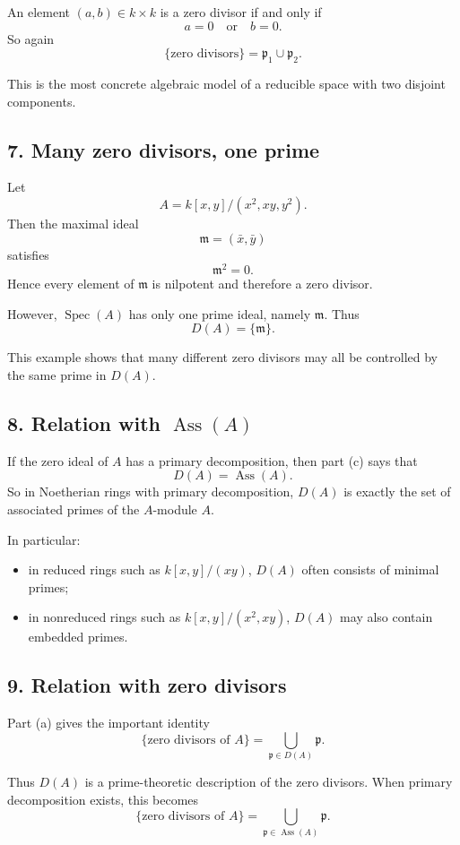 \documentclass[12pt,a4paper,oneside]{report}
\DeclareMathOperator{\Spec}{Spec}
\DeclareMathOperator{\Ass}{Ass}
\theoremstyle{notespace}
\begin{document}
	An element \((a,b)\in k\times k\) is a zero divisor if and only if
	\[
	a=0 \quad \text{or} \quad b=0.
	\]
	So again
	\[
	\{\text{zero divisors}\}=\mathfrak p_1\cup \mathfrak p_2.
	\]
	
	This is the most concrete algebraic model of a reducible space with two disjoint components.
	
	\subsection{7. Many zero divisors, one prime}
	
	Let
	\[
	A=k[x,y]/(x^2,xy,y^2).
	\]
	Then the maximal ideal
	\[
	\mathfrak m=(\bar x,\bar y)
	\]
	satisfies
	\[
	\mathfrak m^2=0.
	\]
	Hence every element of \(\mathfrak m\) is nilpotent and therefore a zero divisor.
	
	However, \(\Spec(A)\) has only one prime ideal, namely \(\mathfrak m\). Thus
	\[
	D(A)=\{\mathfrak m\}.
	\]
	
	This example shows that many different zero divisors may all be controlled by the same prime in \(D(A)\).
	
	\subsection{8. Relation with \(\Ass(A)\)}
	
	If the zero ideal of \(A\) has a primary decomposition, then part (c) says that
	\[
	D(A)=\Ass(A).
	\]
	So in Noetherian rings with primary decomposition, \(D(A)\) is exactly the set of associated primes of the \(A\)-module \(A\).
	
	In particular:
	\begin{itemize}
		\item in reduced rings such as \(k[x,y]/(xy)\), \(D(A)\) often consists of minimal primes;
		\item in nonreduced rings such as \(k[x,y]/(x^2,xy)\), \(D(A)\) may also contain embedded primes.
	\end{itemize}
	
	\subsection{9. Relation with zero divisors}
	
	Part (a) gives the important identity
	\[
	\{\text{zero divisors of }A\}
	=
	\bigcup_{\mathfrak p\in D(A)} \mathfrak p.
	\]
	
	Thus \(D(A)\) is a prime-theoretic description of the zero divisors.
	When primary decomposition exists, this becomes
	\[
	\{\text{zero divisors of }A\}
	=
	\bigcup_{\mathfrak p\in \Ass(A)} \mathfrak p.
	\]
	
\end{document}
